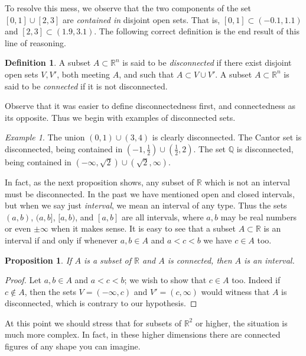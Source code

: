 \documentclass[11pt,oneside]{amsbook}
\newcommand{\Q}{\mathbb Q}
\newcommand{\R}{\mathbb R}
\theoremstyle{definition}
\theoremstyle{plain}
\newtheorem{proposition}[theorem]{Proposition}
\theoremstyle{definition}
\newtheorem{definition}[theorem]{Definition}
\theoremstyle{remark}
\newtheorem{example}[theorem]{Example}
\numberwithin{equation}{section}
\numberwithin{figure}{section}
\begin{document}
To resolve this mess, we observe that the two components of the set $[0,1]\cup[2,3]$ are \emph{contained in} disjoint open sets. That is, $[0,1]\subset(-0.1,1.1)$ and $[2,3]\subset(1.9,3.1)$. The following correct definition is the end result of this line of reasoning.

\begin{definition}
  A subset $A\subset\R^n$ is said to be \emph{disconnected} if there exist disjoint open sets $V,V'$, both meeting $A$, and such that $A\subset V\cup V'$. A subset $A\subset\R^n$ is said to be \emph{connected} if it is not disconnected.
\end{definition}

Observe that it was easier to define disconnectedness first, and connectedness as its opposite. Thus we begin with examples of disconnected sets.

\begin{example}
  The union $(0,1)\cup(3,4)$ is clearly disconnected. The Cantor set is disconnected, being contained in $(-1,\frac12)\cup(\frac12,2)$. The set $\Q$ is disconnected, being contained in $(-\infty,\sqrt2)\cup(\sqrt2,\infty)$.
\end{example}

In fact, as the next proposition shows, any subset of $\R$ which is not an interval must be disconnected. In the past we have mentioned open and closed intervals, but when we say just \emph{interval}, we mean an interval of any type. Thus the sets $(a,b)$, $(a,b]$, $[a,b)$, and $[a,b]$ are all intervals, where $a,b$ may be real numbers or even $\pm\infty$ when it makes sense. It is easy to see that a subset $A\subset\R$ is an interval if and only if whenever $a,b\in A$ and $a<c<b$ we have $c\in A$ too.

\begin{proposition}
  If $A$ is a subset of $\R$ and $A$ is connected, then $A$ is an interval.
\end{proposition}

\begin{proof}
  Let $a,b\in A$ and $a<c<b$; we wish to show that $c\in A$ too. Indeed if $c\notin A$, then the sets $V=(-\infty,c)$ and $V'=(c,\infty)$ would witness that $A$ is disconnected, which is contrary to our hypothesis.
\end{proof}

At this point we should stress that for subsets of $\R^2$ or higher, the situation is much more complex. In fact, in these higher dimensions there are connected figures of any shape you can imagine.
\end{document}
